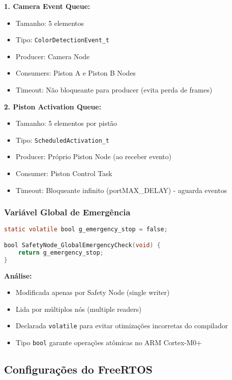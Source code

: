\documentclass[12pt,a4paper]{article}
\begin{document}
\textbf{1. Camera Event Queue:}
\begin{itemize}
    \item Tamanho: 5 elementos
    \item Tipo: \texttt{ColorDetectionEvent\_t}
    \item Producer: Camera Node
    \item Consumers: Piston A e Piston B Nodes
    \item Timeout: Não bloqueante para producer (evita perda de frames)
\end{itemize}

\textbf{2. Piston Activation Queue:}
\begin{itemize}
    \item Tamanho: 5 elementos por pistão
    \item Tipo: \texttt{ScheduledActivation\_t}
    \item Producer: Próprio Piston Node (ao receber evento)
    \item Consumer: Piston Control Task
    \item Timeout: Bloqueante infinito (portMAX\_DELAY) - aguarda eventos
\end{itemize}

\subsubsection{Variável Global de Emergência}

\begin{lstlisting}[language=C, caption={Flag global de emergência}]
static volatile bool g_emergency_stop = false;

bool SafetyNode_GlobalEmergencyCheck(void) {
    return g_emergency_stop;
}
\end{lstlisting}

\textbf{Análise:}
\begin{itemize}
    \item Modificada apenas por Safety Node (single writer)
    \item Lida por múltiplos nós (multiple readers)
    \item Declarada \texttt{volatile} para evitar otimizações incorretas do compilador
    \item Tipo \texttt{bool} garante operações atômicas no ARM Cortex-M0+
\end{itemize}

\subsection{Configurações do FreeRTOS}
\end{document}

